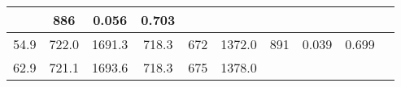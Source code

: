 \documentclass[a4paper,10pt]{article}
\begin{document}
\begin{longtable}{
     |
%    
    c|
%    
    c|
%    
    c|
%    
    c|
%    
    c|
%    
    c|
%    
    c|
%    
    c|
%    
    c|
%    
    c|
%    
    }
%        
        & 886
%        

%        

%        
        & 0.056
%        

%        

%        
        & 0.703
%        

%        
        \\
        \hline

        

%        

%        
        54.9
%        

%        

%        
        & 722.0
%        

%        

%        
        & 1691.3
%        

%        

%        
        & 718.3
%        

%        

%        
        & 672
%        

%        

%        
        & 1372.0
%        

%        

%        
        & 891
%        

%        

%        
        & 0.039
%        

%        

%        
        & 0.699
%        

%        
        \\
        \hline

        

%        

%        
        62.9
%        

%        

%        
        & 721.1
%        

%        

%        
        & 1693.6
%        

%        

%        
        & 718.3
%        

%        

%        
        & 675
%        

%        

%        
        & 1378.0
%        

%        


\end{longtable}
\end{document}
